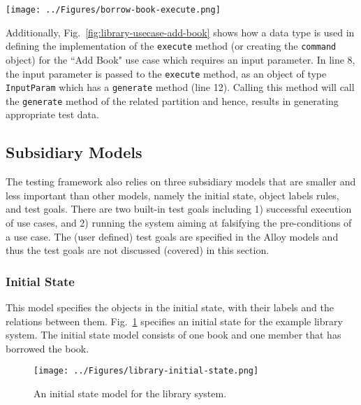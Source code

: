 \begin{figure*}[h]
\centering
\texttt{[image: ../Figures/borrow-book-execute.png]}
\caption{Implementation of the \texttt{Command} interface for ``Borrow Book" use case.}
\label{fig:library-borrow-book-execute}
\end{figure*}

Additionally, Fig.~\ref{fig:library-usecase-add-book} shows how a data type is used in defining the implementation of the \texttt{execute} method (or creating the \texttt{command} object) for the ``Add Book" use case which requires an input parameter.  In line 8, the input parameter is passed to the \texttt{execute} method, as an object of type \texttt{InputParam} which has a \texttt{generate} method (line 12). Calling this method will call the \texttt{generate} method of the related partition and hence, results in generating appropriate test data. 

\subsection{Subsidiary Models}
\label{sec:create-test model-subsidiary-models}
The testing framework also relies on three subsidiary models that are smaller and less important than other models, namely the initial state, object labels rules, and test goals. There are two built-in test goals including 1) successful execution of use cases, and 2) running the system aiming at falsifying the pre-conditions of a use case. The (user defined) test goals are specified in the Alloy models and thus the test goals are not discussed (covered) in this section.

\subsubsection{Initial State}
\label{sec:subsidiary-models-initial-state}
This model specifies the objects in the initial state, with their labels and the relations between them. Fig.~\ref{fig:library-initial-state} specifies an initial state for the example library system. The initial state model consists of one book and one member that has borrowed the book.

\begin{figure}[h]
\centering
\texttt{[image: ../Figures/library-initial-state.png]}
\caption{An initial state model for the library system.}
\label{fig:library-initial-state}
\end{figure}

